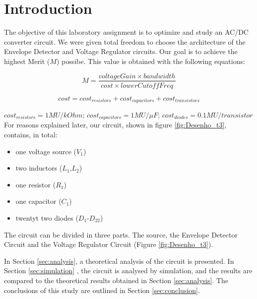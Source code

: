 
\section{Introduction}
\label{sec:introduction}



The objective of this laboratory assignment is to optimize and study an AC/DC converter
circuit. We were given total freedom to choose the architecture of the Envelope Detector
and Voltage Regulator circuits. Our goal is to achieve the highest Merit ($M$) possibe. This
value is obtained with the following equations:
	
\[
M = \frac{voltageGain\times bandwidth}{cost\times lowerCutoffFreq}
\]

\[
 cost = cost_{resistors} + cost_{capacitors} + cost_{transistors} 
\]

$cost_{resistors} = 1MU/kOhm$; $cost_{capacitors} = 1MU/\mu F$;
$cost_{diodes} = 0.1MU/transistor$ \\

For reasons explained later, our circuit, shown in figure \ref{fig:Desenho_t3}, contains,
in total:

\begin{itemize}
	\item one voltage source ($V_1$)
	\item two inductors ($L_1$,$L_2$)
	\item one resistor ($R_1$)
	\item one capacitor ($C_1$)
	\item twentyt two diodes ($D_1$-$D_{22}$)
\end{itemize}

The circuit can be divided in three parts. The source, the Envelope Detector Circuit and the
Voltage Regulator Circuit (Figure \ref{fig:Desenho_t3}).

In Section \ref{sec:analysis}, a theoretical analysis of the circuit is presented. In
Section \ref{sec:simulation} , the circuit is analysed by simulation, and the results are
compared to the theoretical results obtained in Section \ref{sec:analysis}. The conclusions
of this study are outlined in Section \ref{sec:conclusion}.




